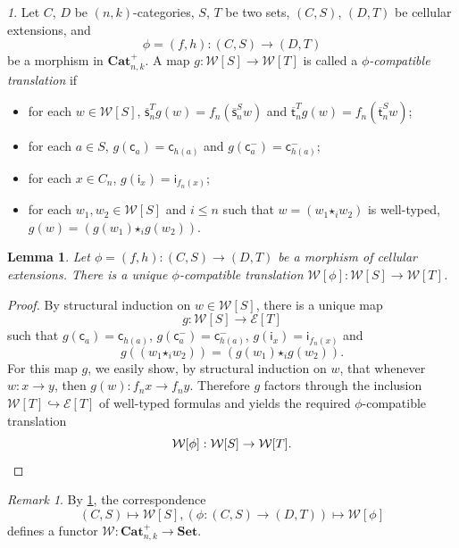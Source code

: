 \documentclass[reqno]{amsart}
\theoremstyle{plain}
\newtheorem{lemma}[subsubsection]{Lemma}
\theoremstyle{definition}
\theoremstyle{remark}
\newtheorem{remark}[subsubsection]{Remark}
\newtheorem{paragr}[subsubsection]{} %
\newcommand{\pair}[2]{(#1,#2)}       %
\newcommand{\source}{\mathsf{s}} %
\newcommand{\target}{\mathsf{t}} %
\newcommand{\ctg}[1]{\mathbf{#1}}  %
\newcommand{\Set}{\ctg{Set}}    %
\newcommand{\Cat}{\ctg{Cat}}   %
\newcommand{\npCatp}[2]{\Cat_{#1,#2}^{+}} %
\newcommand{\clx}[2]{\pair{#1}{#2}}%
\newcommand{\expr}[1]{\mathcal{E}[#1]} %
\newcommand{\WW}{\mathcal{W}}
\newcommand{\wtx}[1]{\WW[#1]} %
\newcommand{\formal}[1]{\mathsf{#1}} %
\newcommand{\fcst}[1]{\formal{c}_{#1}} %
\newcommand{\finv}[1]{\formal{c}^{\boldsymbol{-}}_{#1}}%
\newcommand{\fid}[1]{\formal{i}_{#1}} %
\newcommand{\fcomp}[1]{\bm{\star}_{#1}} %
\newcommand{\type}[3]{#1:#2\to #3} %
\newcommand{\scex}[1]{\extend{\source}_{#1}}
\newcommand{\tgex}[1]{\extend{\target}_{#1}}
\newcommand{\extend}[1]{\overline{#1}} %
\begin{document}
 \begin{paragr}\label{paragr:transl}
  Let $C$, $D$ be $\pair nk$-categories, $S$, $T$ be two sets,  $\clx
  CS$, $\clx DT$ be cellular extensions, and
  \[\phi=\pair fh: \clx CS\to\clx DT \]
  be a morphism in $\npCatp nk$. A map $g:\wtx S\to\wtx T$ is called a {\em
   $\phi$-compatible translation} if
  \begin{itemize}
  \item for each $w\in\wtx S$, $\scex n^Tg(w)=f_n(\scex n^S w)$ and
    $\tgex n^T g(w)=f_n(\tgex n^S w)$;
    \item for each $a\in S$, $g(\fcst a)=\fcst{h(a)}$ and $g(\finv
      a)=\finv{h(a)}$;
    \item for each $x\in C_n$,  $g(\fid x)=\fid{f_n(x)}$;
    \item  for each $w_1,w_2\in\wtx S$ and $i\leq n$ such that
      $w=(w_1\fcomp i w_2)$ is well-typed, $g(w)=(g(w_1)\fcomp i g(w_2))$.  
    \end{itemize}
\end{paragr}
\begin{lemma}\label{lemma:transl}
  Let $\phi=\pair fh:\clx CS\to \clx DT$ be a morphism of cellular
  extensions. There is a unique $\phi$-compatible translation $\wtx\phi:\wtx S\to \wtx T$.
\end{lemma}
\begin{proof}
  By structural induction on $w\in\wtx S$, there is a unique map
  \[g:\wtx S\to \expr T\]
  such that $g(\fcst a)=\fcst{h(a)}$, $g(\finv
      a)=\finv{h(a)}$, $g(\fid x)=\fid{f_n(x)}$ and \[g((w_1\fcomp i
      w_2))=(g(w_1)\fcomp i g(w_2)).\] For this map $g$, we easily
      show, by structural induction on $w$, that
      whenever $\type wxy$, then $\type{g(w)}{f_nx}{f_n y}$. Therefore
      $g$ factors through the inclusion $\wtx T\hookrightarrow \expr T$ of
      well-typed formulas and yields the required $\phi$-compatible
      translation \[\wtx\phi:\wtx S\to \wtx T.\qedhere\] 
    \end{proof}
    \begin{remark}\label{rmk:functoriality_of_wtx}
      By \cref{lemma:transl}, the correspondence
      \[
        \clx CS\mapsto \wtx S, (\phi:\clx CS\to \clx
      DT)\mapsto \wtx\phi
        \]
     defines a functor 
      $\WW:\npCatp nk\to\Set$.
    \end{remark}
\end{document}
